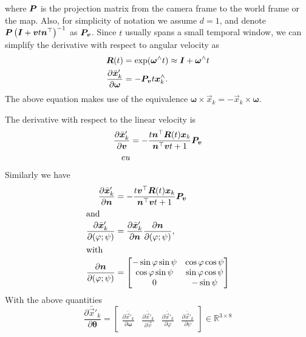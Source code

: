 where $\mat{P}$ is the projection matrix from the camera frame to the
world frame or the map. Also, for simplicity of notation we assume
$d = 1$, and denote
$\mat{P}\left(\mat{I}+\vec{v}t\vec{n}^\top\right)^{-1}$ as
$\mat{P_v}$. Since $t$ usually spans a small temporal window, we can
simplify the derivative with respect to angular velocity as
\begin{align}
  \mat{R}(t)& =\mathrm{exp}(\bm{\omega}^\wedge t)\approx\mat{I}+\bm{\omega}^\wedge t\\
  \frac{\partial\bar{\vec{x}}'_k}{\partial\bm{\omega}}&=-\mat{P_v}t\vec{x}_k^\wedge.  \label{eq:dxdo}
\end{align}
The above equation makes use of the equivalence
$\bm{\omega}\times\vec{x}_k=-\vec{x}_k\times\bm{\omega}$.

The derivative with respect to the linear velocity is
\begin{align}
  \frac{\partial\bar{\vec{x}}'_k}{\partial\vec{v}}&=-\frac{t\vec{n}^\top\mat{R}(t)\vec{x}_k}{\vec{n}^\top\vec{v}t+1}\mat{P_v} \label{eq:dxdv}\\
  eu
\end{align}
Similarly we have
\begin{align}
  \frac{\partial\bar{\vec{x}}'_k}{\partial\vec{n}}&=-\frac{t\vec{v}^\top\mat{R}(t)\vec{x}_k}{\vec{n}^\top\vec{v}t+1}\mat{P_v} \\
  \intertext{and}
  \frac{\partial\bar{\vec{x}}'_k}{\partial(\varphi;\psi)}&= \frac{\partial\bar{\vec{x}}'_k}{\partial\vec{n}}\frac{\partial\vec{n}}{\partial(\varphi;\psi)},\\
  \intertext{with}
  \frac{\partial\vec{n}}{\partial(\varphi;\psi)}&=
                                                  \begin{bmatrix}
                                                    -\sin\varphi\sin\psi&\cos\varphi\cos\psi\\
                                                    \cos\varphi\sin\psi&\sin\varphi\cos\psi\\
                                                    0&-\sin\psi
                                                  \end{bmatrix}
                                                       \label{eq:dvdn}
\end{align}
With the above quantities
\begin{equation*}
  \label{eq:dx_dtheta}
  \frac{\partial\bar{\vec{x}}'_k}{\partial\bm{\theta}}=
  \begin{bmatrix}
    \frac{\partial\bar{\vec{x}}'_k}{\partial\bm{\omega}}& \frac{\partial\bar{\vec{x}}'_k}{\partial\vec{v}}& \frac{\partial\bar{\vec{x}}'_k}{\partial\varphi}&\frac{\partial\bar{\vec{x}}'_k}{\partial\psi}
  \end{bmatrix}\in\mathbb{R}^{3\times8}
\end{equation*}
